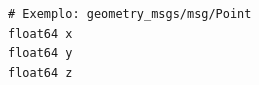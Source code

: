 \documentclass[preview,border=2pt]{standalone}
\begin{document}
\begin{lstlisting}[style=bashstyle]
# Exemplo: geometry_msgs/msg/Point
float64 x
float64 y
float64 z
\end{lstlisting}
\end{document}
